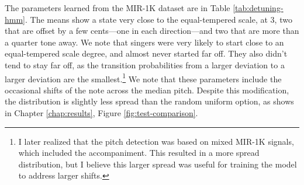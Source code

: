 The parameters learned from the MIR-1K dataset are in Table \ref{tab:detuning-hmm}. The means show a state very close to the equal-tempered scale, at 3, two that are offset by a few cents---one in each direction---and two that are more than a quarter tone away. We note that singers were very likely to start close to an equal-tempered scale degree, and almost never started far off. They also didn't tend to stay far off, as the transition probabilities from a larger deviation to a larger deviation are the smallest.\footnote{I later realized that the pitch detection was based on mixed MIR-1K signals, which included the accompaniment. This resulted in a more spread distribution, but I believe this larger spread was useful for training the model to address larger shifts.} We note that these parameters include the occasional shifts of the note across the median pitch. Despite this modification, the distribution is slightly less spread than the random uniform option, as shows in Chapter \ref{chap:results}, Figure \ref{fig:test-comparison}.

